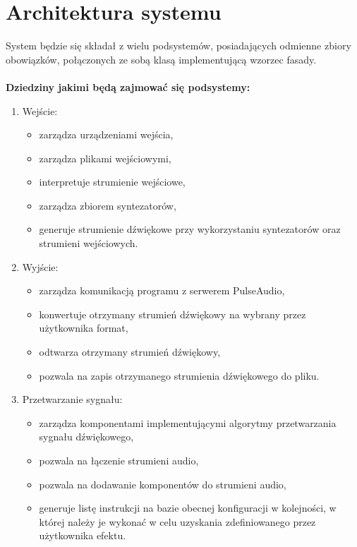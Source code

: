 \section{Architektura systemu}
System będzie się składał z wielu podsystemów, posiadających odmienne zbiory obowiązków, połączonych ze sobą klasą implementującą wzorzec fasady\cite{bib:DesignPatterns}.
\\\\
\textbf{Dziedziny jakimi będą zajmować się podsystemy:}
\begin{enumerate}
    \item Wejście:
        \begin{itemize}
            \item zarządza urządzeniami wejścia,
            \item zarządza plikami wejściowymi,
            \item interpretuje strumienie wejściowe,
            \item zarządza zbiorem syntezatorów,
            \item generuje strumienie dźwiękowe przy wykorzystaniu syntezatorów oraz strumieni wejściowych.
        \end{itemize}
    \item Wyjście:
        \begin{itemize}
            \item zarządza komunikacją programu z serwerem PulseAudio\cite{bib:PulseAudio},
            \item konwertuje otrzymany strumień dźwiękowy na wybrany przez użytkownika format,
            \item odtwarza otrzymany strumień dźwiękowy,
            \item pozwala na zapis otrzymanego strumienia dźwiękowego do pliku.
        \end{itemize}
    \item Przetwarzanie sygnału:
        \begin{itemize}
            \item zarządza komponentami implementującymi algorytmy przetwarzania sygnału dźwiękowego,
            \item pozwala na łączenie strumieni audio,
            \item pozwala na dodawanie komponentów do strumieni audio,
            \item generuje listę instrukcji na bazie obecnej konfiguracji w kolejności, w której należy je wykonać w celu uzyskania zdefiniowanego przez użytkownika efektu.

\end{itemize}
\end{enumerate}
